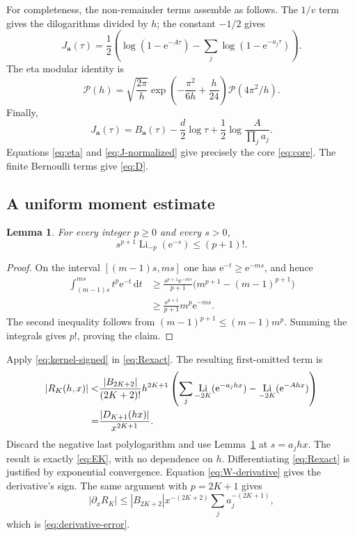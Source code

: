 \documentclass[11pt,a4paper]{article}
\numberwithin{equation}{section}
\newtheorem{lemma}[theorem]{Lemma}
\theoremstyle{definition}\newtheorem{definition}[theorem]{Definition}
\theoremstyle{remark}\newtheorem{remark}[theorem]{Remark}
\DeclareMathOperator{\Li}{Li}
\newcommand{\e}{\mathrm e}
\newcommand{\dd}{\,\mathrm d}
\newcommand{\avec}{\boldsymbol a}
\newcommand{\calP}{\mathcal P}
\begin{document}
For completeness, the non-remainder terms assemble as follows. The $1/v$
term gives the dilogarithms divided by $h$; the constant $-1/2$ gives
\begin{equation}
 J_{\avec}(\tau)=\frac12\left(\log(1-\e^{-A\tau})
                  -\sum_j\log(1-\e^{-a_j\tau})\right).
 \label{eq:J}
\end{equation}
The eta modular identity \cite{dlmf-eta} is
\begin{equation}
 \calP(h)=\sqrt{\frac{2\pi}{h}}
          \exp\left(-\frac{\pi^2}{6h}+\frac h{24}\right)
          \calP(4\pi^2/h).
 \label{eq:eta}
\end{equation}
Finally,
\begin{equation}
 J_{\avec}(\tau)=B_{\avec}(\tau)-\frac d2\log\tau
                       +\frac12\log\frac{A}{\prod_j a_j}.
 \label{eq:J-normalized}
\end{equation}
Equations \eqref{eq:eta} and \eqref{eq:J-normalized} give precisely the core
\eqref{eq:core}. The finite Bernoulli terms give \eqref{eq:D}.

\subsection{A uniform moment estimate}
\begin{lemma}
\label{lem:moment}
For every integer $p\ge0$ and every $s>0$,
\begin{equation}
 s^{p+1}\Li_{-p}(\e^{-s})\le(p+1)!.
 \label{eq:moment-bound}
\end{equation}
\end{lemma}
\begin{proof}
On the interval $[(m-1)s,ms]$ one has $\e^{-t}\ge\e^{-ms}$, and hence
\begin{align*}
 \int_{(m-1)s}^{ms}t^p\e^{-t}\dd t
 &\ge\frac{s^{p+1}\e^{-ms}}{p+1}
          \bigl(m^{p+1}-(m-1)^{p+1}\bigr)\\
 &\ge\frac{s^{p+1}}{p+1}m^p\e^{-ms}.
\end{align*}
The second inequality follows from
$(m-1)^{p+1}\le(m-1)m^p$. Summing the integrals gives $p!$, proving the claim.
\end{proof}

Apply \eqref{eq:kernel-signed} in \eqref{eq:Rexact}. The resulting first-omitted
term is
\begin{align}
 |R_K(h,x)|<&\frac{|B_{2K+2}|}{(2K+2)!}h^{2K+1}
 \left(\sum_j\Li_{-2K}(\e^{-a_jhx})
                    -\Li_{-2K}(\e^{-Ahx})\right)\notag\\
 =&\frac{|D_{K+1}(hx)|}{x^{2K+1}}.
 \label{eq:next-bound}
\end{align}
Discard the negative last polylogarithm and use Lemma~\ref{lem:moment} at
$s=a_jhx$. The result is exactly \eqref{eq:EK}, with no dependence on $h$.
Differentiating \eqref{eq:Rexact} is justified by exponential convergence.
Equation \eqref{eq:W-derivative} gives the derivative's sign. The same argument
with $p=2K+1$ gives
\begin{equation}
 |\partial_xR_K|\le |B_{2K+2}|x^{-(2K+2)}
                               \sum_j a_j^{-(2K+1)},
\end{equation}
which is \eqref{eq:derivative-error}.
\end{document}
